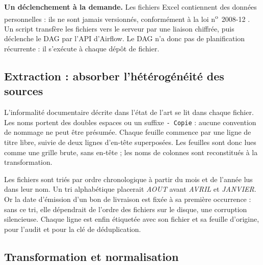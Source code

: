 \textbf{Un déclenchement à la demande.} Les fichiers Excel contiennent des données personnelles : ils ne sont jamais versionnés, conformément à la loi n\textsuperscript{o}~2008-12 \cite{senegalLoi200812}. Un script transfère les fichiers vers le serveur par une liaison chiffrée, puis déclenche le DAG par l'API d'Airflow. Le DAG n'a donc pas de planification récurrente : il s'exécute à chaque dépôt de fichier.

\subsection{Extraction : absorber l'hétérogénéité des sources}
\label{sec: extraction}

L'informalité documentaire décrite dans l'état de l'art se lit dans chaque fichier. Les noms portent des doubles espaces ou un suffixe \texttt{- Copie} : aucune convention de nommage ne peut être présumée. Chaque feuille commence par une ligne de titre libre, suivie de deux lignes d'en-tête superposées. Les feuilles sont donc lues comme une grille brute, sans en-tête ; les noms de colonnes sont reconstitués à la transformation.

Les fichiers sont triés par ordre chronologique à partir du mois et de l'année lus dans leur nom. Un tri alphabétique placerait \textit{AOUT} avant \textit{AVRIL} et \textit{JANVIER}. Or la date d'émission d'un bon de livraison est fixée à sa première occurrence : sans ce tri, elle dépendrait de l'ordre des fichiers sur le disque, une corruption silencieuse. Chaque ligne est enfin étiquetée avec son fichier et sa feuille d'origine, pour l'audit et pour la clé de déduplication.

\subsection{Transformation et normalisation}
\label{sec: transformation}

